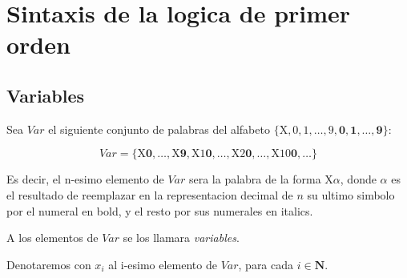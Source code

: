 
\section{Sintaxis de la logica de primer orden}

\subsection{Variables}

\begin{definition}
Sea $Var$ el siguiente conjunto de palabras del alfabeto 
$\{\text{X}, \mathit{0}, \mathit{1}, \dots, \mathit{9}, \mathbf{0}, \mathbf{1}, \dots, \mathbf{9}\}$:

$$
Var = \{\text{X}\mathbf{0}, \dots, \text{X}\mathbf{9}, \text{X}\mathit{1}\mathbf{0}, \dots, \text{X}\mathit{2}\mathbf{0}, \dots, \text{X}\mathit{10}\mathbf{0}, \dots\}
$$

Es decir, el n-esimo elemento de $Var$ sera la palabra de la forma $\text{X}\alpha$, donde $\alpha$ es el resultado de reemplazar en 
la representacion decimal de $n$ su ultimo simbolo por el numeral en bold, y el resto por sus numerales en italics.

A los elementos de $Var$ se los llamara \emph{variables}.

Denotaremos con $x_i$ al i-esimo elemento de $Var$, para cada $i \in \mathbf{N}$.
\end{definition}

